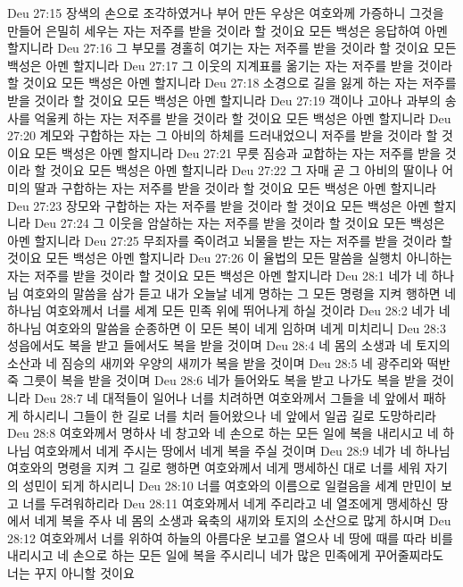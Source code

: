 Deu 27:15  장색의 손으로 조각하였거나 부어 만든 우상은 여호와께 가증하니 그것을 만들어 은밀히 세우는 자는 저주를 받을 것이라 할 것이요 모든 백성은 응답하여 아멘 할지니라
Deu 27:16  그 부모를 경홀히 여기는 자는 저주를 받을 것이라 할 것이요 모든 백성은 아멘 할지니라
Deu 27:17  그 이웃의 지계표를 옮기는 자는 저주를 받을 것이라 할 것이요 모든 백성은 아멘 할지니라
Deu 27:18  소경으로 길을 잃게 하는 자는 저주를 받을 것이라 할 것이요 모든 백성은 아멘 할지니라
Deu 27:19  객이나 고아나 과부의 송사를 억울케 하는 자는 저주를 받을 것이라 할 것이요 모든 백성은 아멘 할지니라
Deu 27:20  계모와 구합하는 자는 그 아비의 하체를 드러내었으니 저주를 받을 것이라 할 것이요 모든 백성은 아멘 할지니라
Deu 27:21  무릇 짐승과 교합하는 자는 저주를 받을 것이라 할 것이요 모든 백성은 아멘 할지니라
Deu 27:22  그 자매 곧 그 아비의 딸이나 어미의 딸과 구합하는 자는 저주를 받을 것이라 할 것이요 모든 백성은 아멘 할지니라
Deu 27:23  장모와 구합하는 자는 저주를 받을 것이라 할 것이요 모든 백성은 아멘 할지니라
Deu 27:24  그 이웃을 암살하는 자는 저주를 받을 것이라 할 것이요 모든 백성은 아멘 할지니라
Deu 27:25  무죄자를 죽이려고 뇌물을 받는 자는 저주를 받을 것이라 할 것이요 모든 백성은 아멘 할지니라
Deu 27:26  이 율법의 모든 말씀을 실행치 아니하는 자는 저주를 받을 것이라 할 것이요 모든 백성은 아멘 할지니라
Deu 28:1  네가 네 하나님 여호와의 말씀을 삼가 듣고 내가 오늘날 네게 명하는 그 모든 명령을 지켜 행하면 네 하나님 여호와께서 너를 세계 모든 민족 위에 뛰어나게 하실 것이라
Deu 28:2  네가 네 하나님 여호와의 말씀을 순종하면 이 모든 복이 네게 임하며 네게 미치리니
Deu 28:3  성읍에서도 복을 받고 들에서도 복을 받을 것이며
Deu 28:4  네 몸의 소생과 네 토지의 소산과 네 짐승의 새끼와 우양의 새끼가 복을 받을 것이며
Deu 28:5  네 광주리와 떡반죽 그릇이 복을 받을 것이며
Deu 28:6  네가 들어와도 복을 받고 나가도 복을 받을 것이니라
Deu 28:7  네 대적들이 일어나 너를 치려하면 여호와께서 그들을 네 앞에서 패하게 하시리니 그들이 한 길로 너를 치러 들어왔으나 네 앞에서 일곱 길로 도망하리라
Deu 28:8  여호와께서 명하사 네 창고와 네 손으로 하는 모든 일에 복을 내리시고 네 하나님 여호와께서 네게 주시는 땅에서 네게 복을 주실 것이며
Deu 28:9  네가 네 하나님 여호와의 명령을 지켜 그 길로 행하면 여호와께서 네게 맹세하신 대로 너를 세워 자기의 성민이 되게 하시리니
Deu 28:10  너를 여호와의 이름으로 일컬음을 세계 만민이 보고 너를 두려워하리라
Deu 28:11  여호와께서 네게 주리라고 네 열조에게 맹세하신 땅에서 네게 복을 주사 네 몸의 소생과 육축의 새끼와 토지의 소산으로 많게 하시며
Deu 28:12  여호와께서 너를 위하여 하늘의 아름다운 보고를 열으사 네 땅에 때를 따라 비를 내리시고 네 손으로 하는 모든 일에 복을 주시리니 네가 많은 민족에게 꾸어줄찌라도 너는 꾸지 아니할 것이요
